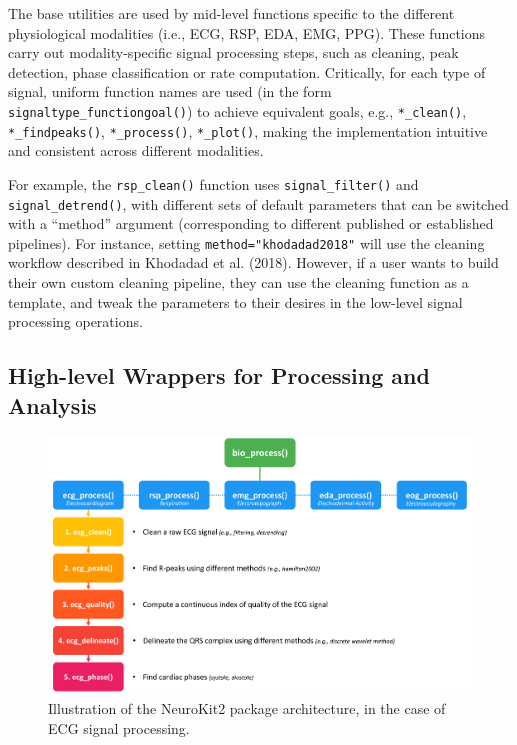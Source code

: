 \documentclass[
  english,
  man,floatsintext]{apa6}
\begin{document}
The base utilities are used by mid-level functions specific to the different physiological modalities (i.e., ECG, RSP, EDA, EMG, PPG). These functions carry out modality-specific signal processing steps, such as cleaning, peak detection, phase classification or rate computation. Critically, for each type of signal, uniform function names are used (in the form \texttt{signaltype\_functiongoal()}) to achieve equivalent goals, e.g., \texttt{*\_clean()}, \texttt{*\_findpeaks()}, \texttt{*\_process()}, \texttt{*\_plot()}, making the implementation intuitive and consistent across different modalities.

For example, the \texttt{rsp\_clean()} function uses \texttt{signal\_filter()} and \texttt{signal\_detrend()}, with different sets of default parameters that can be switched with a \enquote{method} argument (corresponding to different published or established pipelines). For instance, setting \texttt{method="khodadad2018"} will use the cleaning workflow described in Khodadad et al. (2018). However, if a user wants to build their own custom cleaning pipeline, they can use the cleaning function as a template, and tweak the parameters to their desires in the low-level signal processing operations.

\hypertarget{high-level-wrappers-for-processing-and-analysis}{%
\subsection{High-level Wrappers for Processing and Analysis}\label{high-level-wrappers-for-processing-and-analysis}}

\begin{figure}
\includegraphics[width=1\linewidth]{figures/nk_architecture} \caption{Illustration of the NeuroKit2 package architecture, in the case of ECG signal processing.}\label{fig:unnamed-chunk-1}
\end{figure}
\end{document}
